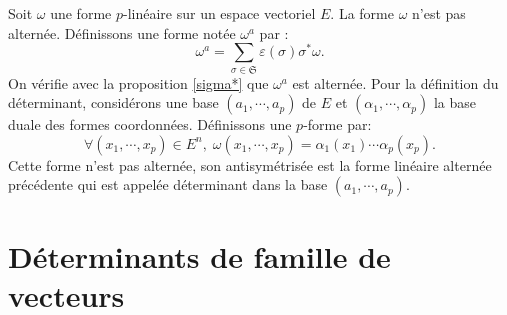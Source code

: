 Soit $\omega$ une forme $p$-linéaire sur un espace vectoriel $E$. La forme $\omega$ n'est pas alternée. Définissons une forme notée $\omega^a$ par :
\[
 \omega^a = \sum_{\sigma \in \mathfrak{S}} \varepsilon(\sigma) \sigma^* \omega.
\]
On vérifie avec la proposition \ref{sigma*} que $\omega^a$ est alternée.
Pour la définition du déterminant, considérons une base $(a_1, \cdots, a_p)$ de $E$ et $(\alpha_1, \cdots, \alpha_p)$ la base duale des formes coordonnées. Définissons une $p$-forme par:
\[
 \forall (x_1, \cdots, x_p) \in E^n, \; \omega(x_1,\cdots,x_p) = \alpha_1(x_1) \cdots \alpha_p(x_p).
\]
Cette forme n'est pas alternée, son antisymétrisée est la forme linéaire alternée précédente qui est appelée déterminant dans la base $(a_1, \cdots, a_p)$.


\section{Déterminants de famille de vecteurs}
